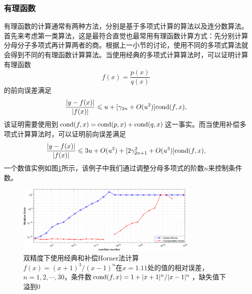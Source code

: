 \documentclass[a4paper,10pt]{ctexart}
\begin{document}
\subsubsection{有理函数}
有理函数的计算通常有两种方法，分别是基于多项式计算的算法\cite{graillat2018accurate}以及连分数算法。首先来考虑第一类算法，这是最符合直觉也最常用有理函数计算方式：先分别计算分母分子多项式再计算两者的商。根据上一小节的讨论，使用不同的多项式算法就会得到不同的有理函数计算算法。当使用经典的多项式计算算法时，可以证明计算有理函数
\[
    f(x) = \frac{p(x)}{q(x)}
\]
的前向误差满足
\begin{equation}
    \frac{|y - f(x)|}{|f(x)|} \leqslant u + [\gamma_{2n} + O(u^2)] {\rm cond}(f,x),
\end{equation}
该证明需要使用到$ {\rm cond}(f,x) = {\rm cond}(p,x) + {\rm cond}(q,x) $这一事实。而当使用补偿多项式计算算法时，可以证明前向误差满足
\begin{equation}
    \frac{|y - f(x)|}{|f(x)|} \leqslant 3u + O(u^2) + [2\gamma_{2n+1}^2 + O(u^3)] {\rm cond}(f,x),
\end{equation}
一个数值实例如图\ref{fig:RationalHorner}所示，该例子中我们通过调整分母多项式的阶数$ n $来控制条件数。
\begin{figure}[htpb]
    \centering
    \includegraphics[width=0.8\textwidth]{RationalHorner.png}
    \caption{双精度下使用经典和补偿Horner法计算$ f(x) = (x+1)^3/(x-1)^n $在$ x=1.11 $处的值的相对误差，$ n=1,2,\cdots ,30 $，条件数$ {\rm cond}(f,x) = 1 + |x+1|^n / |x-1|^n $，缺失值下溢到0}
    \label{fig:RationalHorner}
\end{figure}
\end{document}
